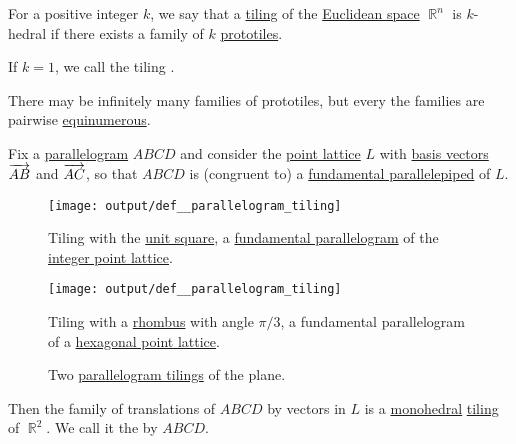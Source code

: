 \begin{definition}\label{def:k_hedral_tiling}
  For a positive integer \( k \), we say that a \hyperref[def:topological_space_tiling]{tiling} of the \hyperref[def:euclidean_space]{Euclidean space} \( \BbbR^n \) is \( k \)-hedral if there exists a family of \( k \) \hyperref[def:prototile]{prototiles}.

  If \( k = 1 \), we call the tiling .
\end{definition}
\begin{defproof}
  There may be infinitely many families of prototiles, but every the families are pairwise \hyperref[def:equinumerosity]{equinumerous}.
\end{defproof}

\begin{definition}\label{def:parallelogram_tiling}
  Fix a \hyperref[def:parallelogram]{parallelogram} \( ABCD \) and consider the \hyperref[def:point_lattice]{point lattice} \( L \) with \hyperref[def:point_lattice_basis]{basis vectors} \( \overrightarrow{AB} \) and \( \overrightarrow{AC} \), so that \( ABCD \) is (congruent to) a \hyperref[def:fundamental_parallelotope]{fundamental parallelepiped} of \( L \).

  \begin{figure}[!ht]
    \begin{subcaptionblock}{0.45\linewidth}
      \centering
      \texttt{[image: output/def\_\_parallelogram\_tiling]}
      \caption{Tiling with the \hyperref[def:unit_hypercube]{unit square}, a \hyperref[def:fundamental_parallelotope]{fundamental parallelogram} of the \hyperref[def:integer_point_lattice]{integer point lattice}.}\label{fig:def:parallelogram_tiling/square}
    \end{subcaptionblock}
    \hfill
    \begin{subcaptionblock}{0.45\linewidth}
      \centering
      \texttt{[image: output/def\_\_parallelogram\_tiling]}
      \caption{Tiling with a \hyperref[def:parallelogram/rhombus]{rhombus} with angle \( \pi / 3 \), a fundamental parallelogram of a \hyperref[def:hexagonal_point_lattice]{hexagonal point lattice}.}\label{fig:def:parallelogram_tiling/rhombus}
    \end{subcaptionblock}
    \caption{Two \hyperref[def:parallelogram_tiling]{parallelogram tilings} of the plane.}\label{fig:def:parallelogram_tiling}
  \end{figure}

  Then the family of translations of \( ABCD \) by vectors in \( L \) is a \hyperref[def:k_hedral_tiling]{monohedral} \hyperref[def:topological_space_tiling]{tiling} of \( \BbbR^2 \). We call it the  by \( ABCD \).
\end{definition}
